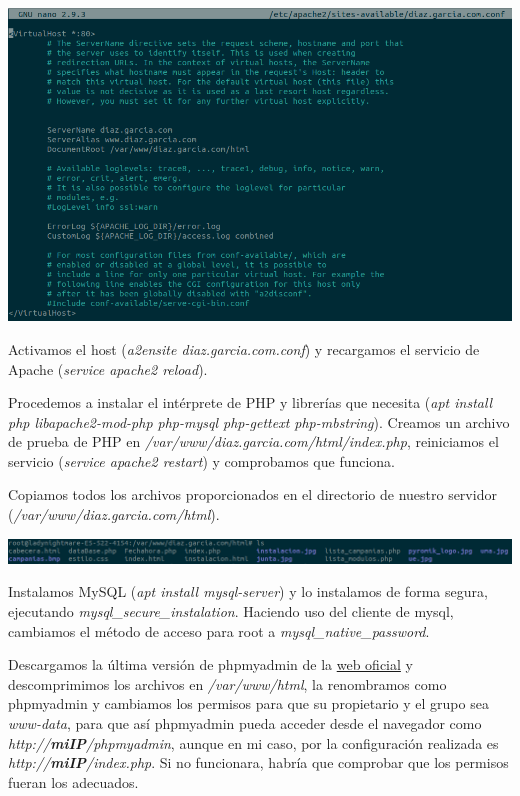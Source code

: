 \documentclass{article}
\begin{document}
\begin{flushleft}
\includegraphics[scale=0.37]{conf.png}
\end{flushleft}

Activamos el host (\textit{a2ensite diaz.garcia.com.conf}) y recargamos el servicio de Apache (\textit{service apache2 reload}).

Procedemos a instalar el intérprete de PHP y librerías que necesita (\textit{apt install php libapache2-mod-php php-­mysql php-­gettext php-­mbstring}). Creamos un archivo de prueba de PHP en \textit{/var/www/diaz.garcia.com/html/index.php}, reiniciamos el servicio (\textit{service apache2 restart}) y comprobamos que funciona.

Copiamos todos los archivos proporcionados en el directorio de nuestro servidor (\textit{/var/www/diaz.garcia.com/html}).

\begin{flushleft}
\includegraphics[scale=0.3]{dir.png}
\end{flushleft}

Instalamos MySQL (\textit{apt install mysql-server}) y lo instalamos de forma segura, ejecutando \textit{mysql\_secure\_instalation}. Haciendo uso del cliente de mysql, cambiamos el método de acceso para root a \textit{mysql\_native\_password}. 

Descargamos la última versión de phpmyadmin de la \href{https://www.phpmyadmin.net/files/}{web oficial} y descomprimimos los archivos en \textit{/var/www/html}, la renombramos como phpmyadmin y cambiamos los permisos para que su propietario y el grupo sea \textit{www-data}, para que así phpmyadmin pueda acceder desde el navegador como \textit{http://\textbf{miIP}/phpmyadmin}, aunque en mi caso, por la configuración realizada es \textit{http://\textbf{miIP}/index.php}. Si no funcionara, habría que comprobar que los permisos fueran los adecuados.
\end{document}
